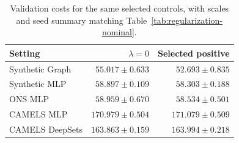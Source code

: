 \begin{table}[ht]
\caption{Validation costs for the same selected controls, with
scales and seed summary matching Table~\ref{tab:regularization-nominal}.}
\label{tab:regularization-validation}
\centering\scriptsize
\begin{tabular}{@{}lrr@{}}
\toprule
Setting & $\lambda=0$ & Selected positive\\
\midrule
Synthetic Graph & $55.017\pm0.633$ & $52.693\pm0.835$\\
Synthetic MLP & $58.897\pm0.109$ & $58.303\pm0.188$\\
ONS MLP & $58.959\pm0.670$ & $58.534\pm0.501$\\
CAMELS MLP & $170.979\pm0.504$ & $171.079\pm0.509$\\
CAMELS DeepSets & $163.863\pm0.159$ & $163.994\pm0.218$\\
\bottomrule
\end{tabular}
\end{table}
